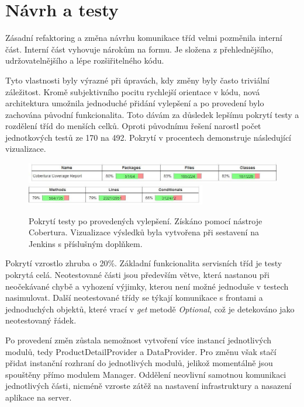 \documentclass[thesis=B,czech]{FITthesis}[2012/06/26]
\begin{document}
\section{Návrh a testy}
Zásadní refaktoring a změna návrhu komunikace tříd velmi pozměnila interní část. 
Interní část vyhovuje nárokům na formu. Je složena z přehlednějšího, udržovatelnějšího a
lépe rozšiřitelného kódu.
\par
Tyto vlastnosti byly výrazné při úpravách, kdy změny byly často triviální záležitost.
Kromě subjektivního pocitu rychlejší orientace v kódu, nová architektura umožnila jednoduché přidání vylepšení
a po provedení bylo zachována původní funkcionalita. Toto dávám za důsledek lepšímu pokrytí
testy a rozdělení tříd do menších celků. Oproti původnímu řešení narostl počet jednotkových
testů ze 170 na 492. Pokrytí v procentech demonstruje následující vizualizace.

\begin{figure}[h]\centering
 	\includegraphics[width=1.0\textwidth]{resources/cobertura-report-new-1}
 	\includegraphics[width=0.7\textwidth]{resources/cobertura-report-new-2}
	\caption[Pokrytí testy po provedených vylepšení]{Pokrytí testy po provedených vylepšení. Získáno pomocí nástroje Cobertura. Vizualizace
	výsledků byla vytvořena při sestavení na Jenkins s příslušným doplňkem.}\label{fig:cober-new}
\end{figure}

Pokrytí vzrostlo zhruba o 20\%. Základní funkcionalita servisních tříd je testy pokrytá celá.
Neotestované části jsou především větve, která nastanou při neočekávané chybě a vyhození výjimky, kterou není možné jednoduše v testech nasimulovat.
Další neotestované třídy se týkají komunikace s frontami a jednoduchých objektů, které vrací v \textit{get} metodě \textit{Optional}, což je detekováno jako neotestovaný řádek.
\par
Po provedení změn zůstala nemožnost vytvoření více instancí jednotlivých modulů, tedy ProductDetailProvider a DataProvider.
Pro změnu však stačí přidat instanční rozhraní do jednotlivých modulů, jelikož momentálně jsou spouštěny přímo modulem Manager. Oddělení neovlivní samotnou komunikaci jednotlivých části, nicméně vzroste zátěž na nastavení infrastruktury a nasazení aplikace na server.
\end{document}
